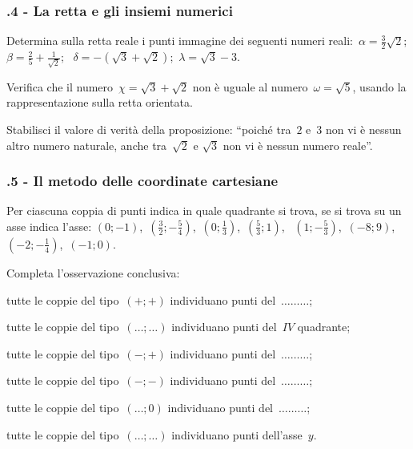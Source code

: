 \subsubsection*{\thechapter.4 - La retta e gli insiemi numerici}

\begin{esercizio}
\label{ese:\thechapter.17}
Determina sulla retta reale i punti immagine dei seguenti numeri reali:~$\alpha =\frac{3}{2}\sqrt{2}$;\, $\beta =\frac{2}{5}+\frac{1}{\sqrt{2}}$;
\, $\delta =-\left(\sqrt{3}+\sqrt{2}\right)$;\, $\lambda =\sqrt{3}-3$.
\end{esercizio}

\begin{esercizio}
\label{ese:\thechapter.18}
Verifica che il numero~$\chi =\sqrt{3}+\sqrt{2}$ non è uguale al numero~$\omega =\sqrt{5}$, usando la rappresentazione sulla retta orientata.
\end{esercizio}

\begin{esercizio}
\label{ese:\thechapter.19}
Stabilisci il valore di verità della proposizione: ``poiché tra~$2$ e~$3$ non vi è nessun altro numero naturale, anche tra~$\sqrt{2}$ e
$\sqrt{3}$ non vi è nessun numero reale''.
\end{esercizio}

\subsubsection*{\thechapter.5 - Il metodo delle coordinate cartesiane}
\begin{esercizio}
\label{ese:\thechapter.20}
Per ciascuna coppia di punti indica in quale quadrante si trova, se si trova su un asse indica l'asse:
$(0;-1)$, \,$\left(\frac{3}{2};-\frac{5}{4}\right)$, \,$\left(0;\frac{1}{3}\right)$, \,$\left(\frac{5}{3};1\right)$, \,
$\left(1;-\frac{5}{3}\right)$, \,$(-8;9)$, \,$\left(-2;-\frac{1}{4}\right)$, \,$(-1;0)$.

Completa l'osservazione conclusiva:
\begin{itemize*}
\item tutte le coppie del tipo~$(+;+)$ individuano punti del~$\ldots \ldots \ldots$;
\item tutte le coppie del tipo~$(\ldots;\ldots)$ individuano punti del~$IV$ quadrante;
\item tutte le coppie del tipo~$(-;+)$ individuano punti del~$\ldots \ldots \ldots$;
\item tutte le coppie del tipo~$(-;-)$ individuano punti del~$\ldots \ldots \ldots$;
\item tutte le coppie del tipo~$(\ldots;0)$ individuano punti del~$\ldots \ldots \ldots$;
\item tutte le coppie del tipo~$(\ldots;\ldots)$ individuano punti dell'asse~$y$.
\end{itemize*}
\end{esercizio}

